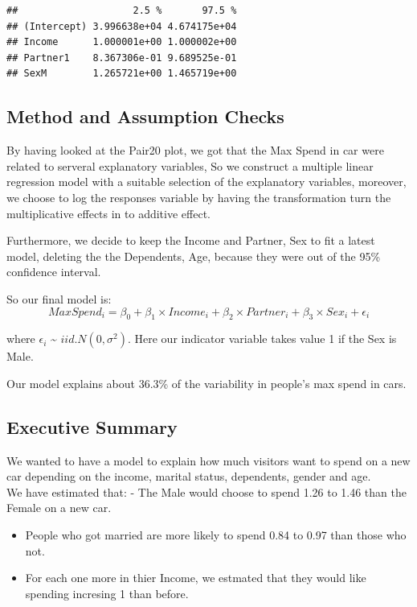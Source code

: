 \documentclass[
]{article}
\begin{document}
\begin{verbatim}
##                    2.5 %       97.5 %
## (Intercept) 3.996638e+04 4.674175e+04
## Income      1.000001e+00 1.000002e+00
## Partner1    8.367306e-01 9.689525e-01
## SexM        1.265721e+00 1.465719e+00
\end{verbatim}

\hypertarget{method-and-assumption-checks}{%
\subsection{Method and Assumption
Checks}\label{method-and-assumption-checks}}

By having looked at the Pair20 plot, we got that the Max Spend in car
were related to serveral explanatory variables, So we construct a
multiple linear regression model with a suitable selection of the
explanatory variables, moreover, we choose to log the responses variable
by having the transformation turn the multiplicative effects in to
additive effect.

Furthermore, we decide to keep the Income and Partner, Sex to fit a
latest model, deleting the the Dependents, Age, because they were out of
the 95\% confidence interval.

So our final model is:
\[MaxSpend_i = \beta_0 + \beta_1 \times Income_i + \beta_2 \times Partner_i + \beta_3 \times Sex_i + \epsilon_i \]

where \(\epsilon_i\) \textasciitilde{} \(iid.N(0,\sigma^2)\). Here our
indicator variable takes value 1 if the Sex is Male.

Our model explains about 36.3\% of the variability in people's max spend
in cars.

\hypertarget{executive-summary}{%
\subsection{Executive Summary}\label{executive-summary}}

We wanted to have a model to explain how much visitors want to spend on
a new car depending on the income, marital status, dependents, gender
and age.\\
We have estimated that: - The Male would choose to spend 1.26 to 1.46
than the Female on a new car.

\begin{itemize}
\item
  People who got married are more likely to spend 0.84 to 0.97 than
  those who not.
\item
  For each one more in thier Income, we estmated that they would like
  spending incresing 1 than before.
\end{itemize}
\end{document}
